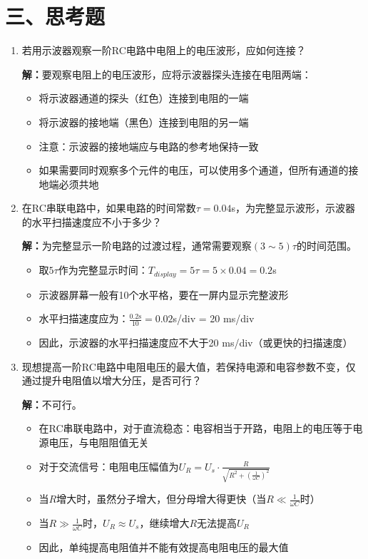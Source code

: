 \documentclass[12pt,a4paper]{article}
\begin{document}
\section*{三、思考题}
\begin{enumerate}
    \item 若用示波器观察一阶RC电路中电阻上的电压波形，应如何连接？
    
    \textbf{解：}要观察电阻上的电压波形，应将示波器探头连接在电阻两端：
    \begin{itemize}
        \item 将示波器通道的探头（红色）连接到电阻的一端
        \item 将示波器的接地端（黑色）连接到电阻的另一端
        \item 注意：示波器的接地端应与电路的参考地保持一致
        \item 如果需要同时观察多个元件的电压，可以使用多个通道，但所有通道的接地端必须共地
    \end{itemize}
    \vspace{0.5cm}
    
    \item 在RC串联电路中，如果电路的时间常数$\tau = 0.04$s，为完整显示波形，示波器的水平扫描速度应不小于多少？
    
    \textbf{解：}为完整显示一阶电路的过渡过程，通常需要观察$(3\sim5)\tau$的时间范围。
    \begin{itemize}
        \item 取$5\tau$作为完整显示时间：$T_{display} = 5\tau = 5 \times 0.04 = 0.2$s
        \item 示波器屏幕一般有10个水平格，要在一屏内显示完整波形
        \item 水平扫描速度应为：$\frac{0.2\text{s}}{10} = 0.02$s/div = 20 ms/div
        \item 因此，示波器的水平扫描速度应不大于20 ms/div（或更快的扫描速度）
    \end{itemize}
    \vspace{0.5cm}

    \item 现想提高一阶RC电路中电阻电压的最大值，若保持电源和电容参数不变，仅通过提升电阻值以增大分压，是否可行？
    
    \textbf{解：}不可行。
    \begin{itemize}
        \item 在RC串联电路中，对于直流稳态：电容相当于开路，电阻上的电压等于电源电压，与电阻阻值无关
        \item 对于交流信号：电阻电压幅值为$U_R = U_s \cdot \frac{R}{\sqrt{R^2 + (\frac{1}{\omega C})^2}}$
        \item 当$R$增大时，虽然分子增大，但分母增大得更快（当$R \ll \frac{1}{\omega C}$时）
        \item 当$R \gg \frac{1}{\omega C}$时，$U_R \approx U_s$，继续增大$R$无法提高$U_R$
        \item 因此，单纯提高电阻值并不能有效提高电阻电压的最大值
    \end{itemize}
    \vspace{0.5cm}
    

\end{enumerate}
\end{document}
